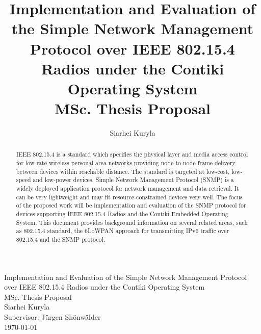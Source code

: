 \documentclass[12pt, titlepage, a4paper]{report}
\title{Implementation and Evaluation of the Simple Network Management Protocol over IEEE 802.15.4 Radios under the Contiki Operating System\\ MSc. Thesis Proposal}
\author{Siarhei Kuryla}
\begin{document}
\begin{titlepage}

\begin{center}


\huge Implementation and Evaluation of the Simple Network Management Protocol over IEEE 802.15.4 Radios under the Contiki Operating System\\ [0.5cm]

\Large MSc. Thesis Proposal\\ [0.5cm]
Siarhei Kuryla\\ [0.5cm]

\large Supervisor: J\"urgen Sh\"onw\"alder\\[0.5cm]
{\large \today}


\end{center}
\end{titlepage}

\newpage
\thispagestyle{empty}

\newpage
\begin{abstract}
IEEE 802.15.4 is a standard which specifies the physical layer and media access control for low-rate wireless personal area networks providing node-to-node frame delivery between devices within reachable distance. The standard is targeted at low-cost, low-speed and low-power devices. Simple Network Management Protocol (SNMP) is a widely deployed application protocol for network management and data retrieval. It can be very lightweight and may fit resource-constrained devices very well. The focus of the proposed work will be implementation and evaluation of the SNMP protocol for devices supporting IEEE 802.15.4 Radios and the Contiki Embedded Operating System. This document provides background information on several related areas, such as 802.15.4 standard,                          the 6LoWPAN approach for transmitting IPv6 traffic over 802.15.4 and the SNMP protocol.

\end{abstract}

\newpage
\tableofcontents
\newpage

\end{document}

